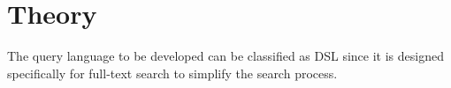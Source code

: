 \newpage
\section{Theory}
The query language to be developed can be classified as \ac{DSL} since it is designed specifically for full-text search to simplify the search process.